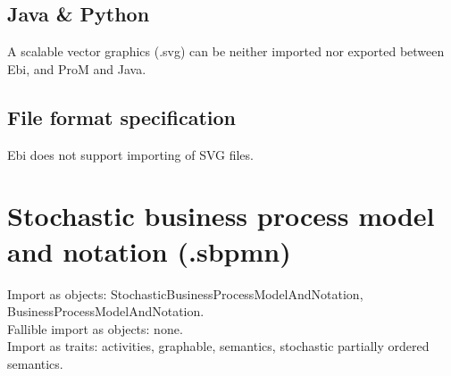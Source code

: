 {\subsection*{Java \& Python}
A scalable vector graphics (.svg) can be neither imported nor exported between Ebi, and ProM and Java.
\subsection*{File format specification}Ebi does not support importing of SVG files.
\clearpage
\section{Stochastic business process model and notation (.sbpmn)}
\label{filehandler:stochastic business process model and notation}
Import as objects: StochasticBusinessProcessModelAndNotation, BusinessProcessModelAndNotation.
\\Fallible import as objects: none.
\\Import as traits: activities, graphable, semantics, stochastic partially ordered semantics.
}
